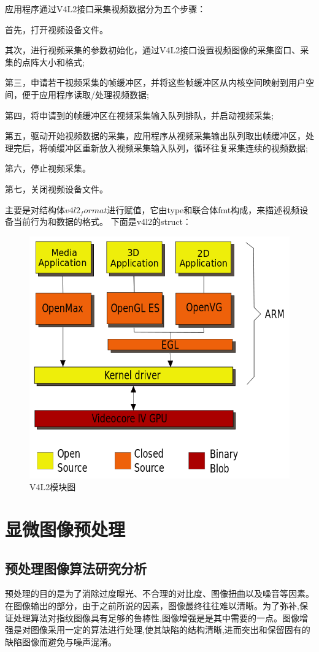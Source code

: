 应用程序通过V4L2接口采集视频数据分为五个步骤：

首先，打开视频设备文件。

其次，进行视频采集的参数初始化，通过V4L2接口设置视频图像的采集窗口、采集的点阵大小和格式;

第三，申请若干视频采集的帧缓冲区，并将这些帧缓冲区从内核空间映射到用户空间，便于应用程序读取/处理视频数据;

第四，将申请到的帧缓冲区在视频采集输入队列排队，并启动视频采集;

第五，驱动开始视频数据的采集，应用程序从视频采集输出队列取出帧缓冲区，处理完后，将帧缓冲区重新放入视频采集输入队列，循环往复采集连续的视频数据;

第六，停止视频采集。

第七，关闭视频设备文件。


主要是对结构体$v4l2_format$进行赋值，它由type和联合体fmt构成，来描述视频设备当前行为和数据的格式。
下面是v4l2的struct：



\begin{figure}[h]
\centering
\includegraphics[width=0.7\linewidth]{Figure/V4L2}
\caption{V4L2模块图}
\label{fig:V4L2}
\end{figure}

\section{显微图像预处理}
\subsection{预处理图像算法研究分析}
预处理的目的是为了消除过度曝光、不合理的对比度、图像扭曲以及噪音等因素。在图像输出的部分，由于之前所说的因素，图像最终往往难以清晰。为了弥补,保证处理算法对指纹图像具有足够的鲁棒性,图像增强是是其中需要的一点。图像增强是对图像采用一定的算法进行处理,使其缺陷的结构清晰,进而突出和保留固有的缺陷图像而避免与噪声混淆。\cite{imageprocessing}

